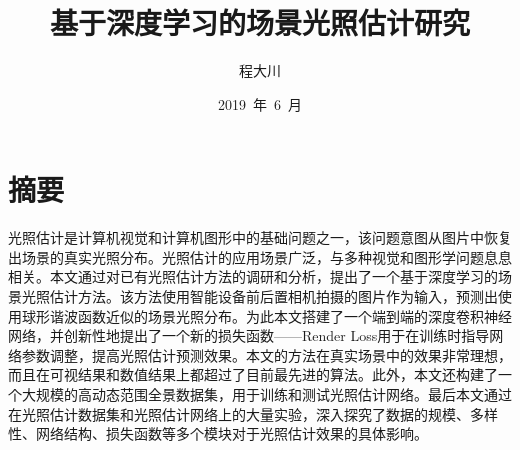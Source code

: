 \confidential{}%
\title{基于深度学习的场景光照估计研究}%
\author{程大川}%
\date{2019~年~6~月}%
\maketitle%
\MAKETITLE%
\makedeclaration%
\chapter*{摘\quad 要}
\setcounter{page}{1}%
光照估计是计算机视觉和计算机图形中的基础问题之一，该问题意图从图片中恢复出场景的真实光照分布。光照估计的应用场景广泛，与多种视觉和图形学问题息息相关。本文通过对已有光照估计方法的调研和分析，提出了一个基于深度学习的场景光照估计方法。该方法使用智能设备前后置相机拍摄的图片作为输入，预测出使用球形谐波函数近似的场景光照分布。为此本文搭建了一个端到端的深度卷积神经网络，并创新性地提出了一个新的损失函数——Render Loss用于在训练时指导网络参数调整，提高光照估计预测效果。本文的方法在真实场景中的效果非常理想，而且在可视结果和数值结果上都超过了目前最先进的算法。此外，本文还构建了一个大规模的高动态范围全景数据集，用于训练和测试光照估计网络。最后本文通过在光照估计数据集和光照估计网络上的大量实验，深入探究了数据的规模、多样性、网络结构、损失函数等多个模块对于光照估计效果的具体影响。

